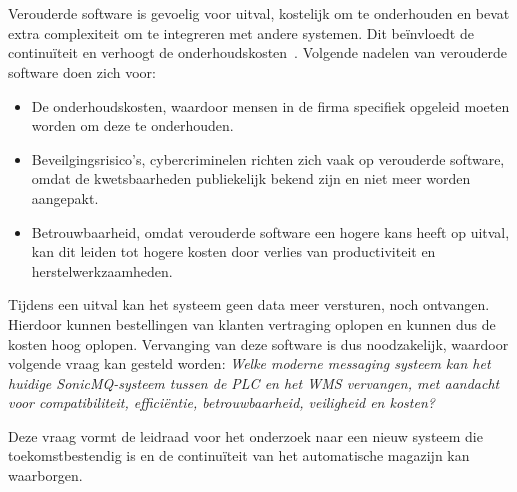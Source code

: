 \section{}%
\label{sec:Probleemstelling}


Verouderde software is gevoelig voor uitval, kostelijk om te onderhouden en bevat extra complexiteit om te integreren met andere systemen.
Dit beïnvloedt de continuïteit en verhoogt de onderhoudskosten~\autocite{Khadka2016}.
Volgende nadelen van verouderde software doen zich voor: 
\begin{itemize}
  \item De onderhoudskosten, waardoor mensen in de firma specifiek opgeleid moeten worden om deze te onderhouden. 
  \item Beveilgingsrisico's, cybercriminelen richten zich vaak op verouderde software, omdat de kwetsbaarheden publiekelijk bekend zijn en niet meer worden aangepakt.
  \item Betrouwbaarheid, omdat verouderde software een hogere kans heeft op uitval, kan dit leiden tot hogere kosten door verlies van productiviteit en herstelwerkzaamheden.
\end{itemize}

Tijdens een uitval kan het systeem geen data meer versturen, noch ontvangen. 
Hierdoor kunnen bestellingen van klanten vertraging oplopen en kunnen dus de kosten hoog oplopen.
Vervanging van deze software is dus noodzakelijk, waardoor volgende vraag kan gesteld worden: 
\newline
\emph{Welke moderne messaging systeem kan het huidige SonicMQ-systeem tussen de PLC en het WMS vervangen, 
met aandacht voor compatibiliteit, efficiëntie, betrouwbaarheid, veiligheid en kosten?}
\newline

Deze vraag vormt de leidraad voor het onderzoek naar een nieuw systeem die toekomstbestendig is 
en de continuïteit van het automatische magazijn kan waarborgen.

